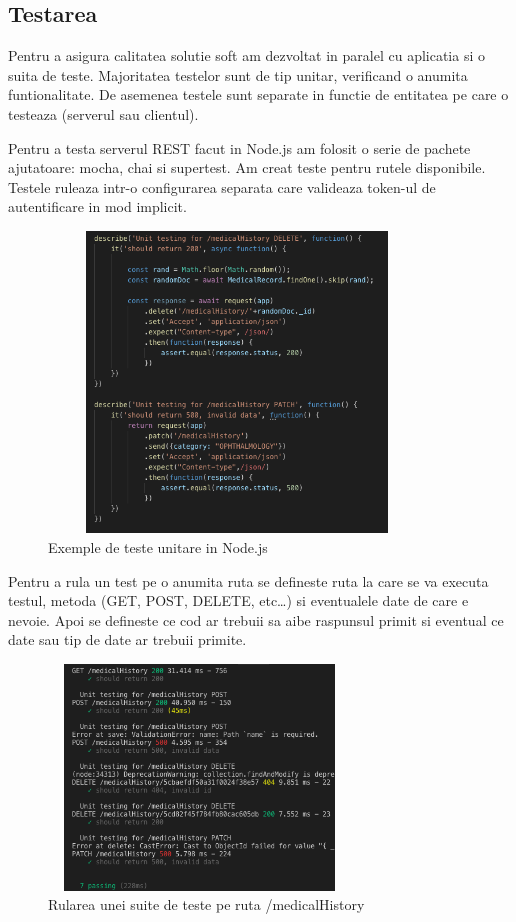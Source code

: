 \documentclass[12pt]{article}
\begin{document}
\newpage
\subsection{Testarea}

Pentru a asigura calitatea solutie soft am dezvoltat in paralel cu aplicatia 
si o suita de teste. Majoritatea testelor sunt de tip unitar, verificand o anumita
funtionalitate. De asemenea testele sunt separate in functie de entitatea pe care o testeaza 
(serverul sau clientul).


Pentru a testa serverul REST facut in Node.js am folosit o serie de pachete ajutatoare: 
mocha, chai si supertest. Am creat teste pentru rutele disponibile. Testele ruleaza intr-o
configurarea separata care valideaza token-ul de autentificare in mod implicit.

\begin{figure}[H]
    \centering
    \includegraphics[width=10cm, height=8cm]{unitnode.png}
    \caption{Exemple de teste unitare in Node.js}
    \end{figure}


Pentru a rula un test pe o anumita ruta se defineste ruta la care se va executa testul,
metoda (GET, POST, DELETE, etc\dots) si eventualele date de care e nevoie. Apoi se defineste
ce cod ar trebuii sa aibe raspunsul primit si eventual ce date sau tip de date ar trebuii primite.

\begin{figure}[H]
    \centering
    \includegraphics[width=8cm, height=6cm]{confnode.png}
    \caption{Rularea unei suite de teste pe ruta /medicalHistory}
    \end{figure}
\end{document}
